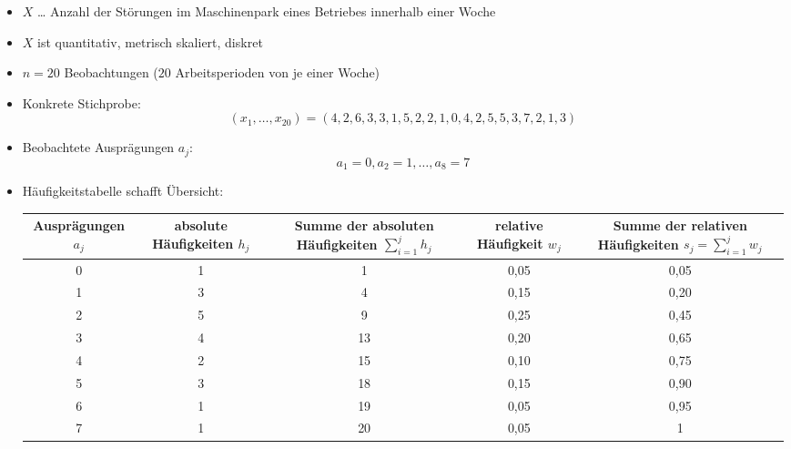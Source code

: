 \documentclass{scrreprt}
\begin{document}
\begin{itemize}
\item $X$ … Anzahl der Störungen im Maschinenpark eines Betriebes innerhalb einer Woche
\item $X$ ist quantitativ, metrisch skaliert, diskret
\item $n=20$ Beobachtungen ($20$ Arbeitsperioden von je einer Woche)
\item Konkrete Stichprobe:
$$(x_1, \ldots, x_{20})=(4,2,6,3,3,1,5,2,2,1,0,4,2,5,5,3,7,2,1,3)$$
\item Beobachtete Ausprägungen $a_j$:
$$a_1=0, a_2 = 1, \ldots , a_8=7$$
\item Häufigkeitstabelle schafft Übersicht:\\
\begin{tabular}{C{0.15} C{0.19} C{0.19} C{0.19} C{0.19}}
Ausprägungen $a_j$ & absolute Häufigkeiten $h_j$ & Summe der absoluten Häufigkeiten $\sum_{i=1}^j h_j$ & relative Häufigkeit $w_j$ & Summe der relativen Häufigkeiten $s_j=\sum_{i=1}^j w_j$\\ &	1 & 1 & 0,05 & 0,05\\
1 & 3 & 4 & 0,15 & 0,20\\
2 & 5 & 9 & 0,25 & 0,45\\
3 & 4 & 13 & 0,20 & 0,65\\
4 & 2 & 15 & 0,10 & 0,75\\
5 & 3 & 18 & 0,15 & 0,90\\
6 & 1 & 19 & 0,05 & 0,95\\
7 & 1 & 20  & 0,05 & 1
\end{tabular}

\end{itemize}
\end{document}
